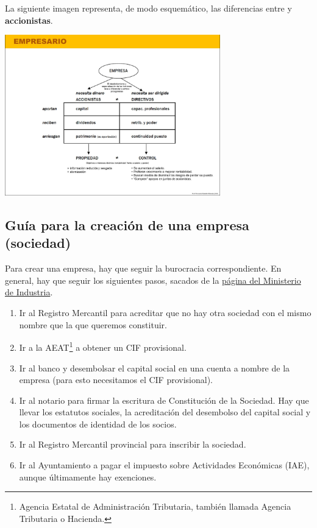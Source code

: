 \documentclass[nochap,palatino,shortheader]{apuntes}
\begin{document}
La siguiente imagen representa, de modo esquemático, las diferencias entre  y \textbf{accionistas}.

\begin{center}
\includegraphics[width=0.7\textwidth]{img/empresario.png}
\label{fig:AccionistasVSDirectivos}
\end{center}

\subsection{Guía para la creación de una empresa (sociedad)}

Para crear una empresa, hay que seguir la burocracia correspondiente. En general, hay que seguir los siguientes pasos, sacados de la \href{http://www.creatuempresa.org/es-ES/PasoApaso/}{página del Ministerio de Industria}.

\begin{enumerate}
\item Ir al Registro Mercantil para acreditar que no hay otra sociedad con el mismo nombre que la que queremos constituir.
\item Ir a la AEAT\footnote{Agencia Estatal de Administración Tributaria, también llamada Agencia Tributaria o Hacienda.} a obtener un CIF provisional.
\item Ir al banco y desembolsar el capital social en una cuenta a nombre de la empresa (para esto necesitamos el CIF provisional).
\item Ir al notario para firmar la escritura de Constitución de la Sociedad. Hay que llevar los estatutos sociales, la acreditación del desembolso del capital social y los documentos de identidad de los socios.
\item Ir al Registro Mercantil provincial para inscribir la sociedad.
\item Ir al Ayuntamiento a pagar el impuesto sobre Actividades Económicas (IAE), aunque últimamente hay exenciones.
\end{enumerate}
\end{document}
